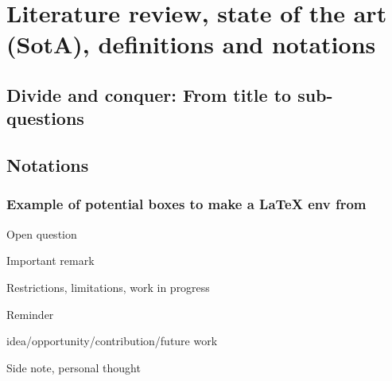 \chapter{Literature review, state of the art (SotA), definitions and notations}
\section{Divide and conquer: From title to sub-questions}

\section{Notations}
\subsection{Example of potential boxes to make a \LaTeX{} env from}
\begin{bclogo}[arrondi=0.1, logo=\bcquestion, couleur=grey,noborder=true]{Open question}
    \lipsum[1-1]
\end{bclogo}


\begin{bclogo}[arrondi=0.1, logo=\bcattention, couleur=grey,noborder=true]{Important remark}
    \lipsum[1-1]
\end{bclogo}

\begin{bclogo}[arrondi=0.1, logo=\bcpanchant, couleur=grey,noborder=true]{Restrictions, limitations, work in progress}
    \lipsum[1-1]
\end{bclogo}

\begin{bclogo}[arrondi=0.1, logo=\bcinfo, couleur=grey,noborder=true]{Reminder}
    \lipsum[1-1]
\end{bclogo}


\begin{bclogo}[arrondi=0.1, logo=\bclampe, couleur=grey,noborder=true]{idea/opportunity/contribution/future work}
    \lipsum[1-1]
\end{bclogo}

\begin{bclogo}[arrondi=0.1, logo=\bccrayon, couleur=grey,noborder=true]{Side note, personal thought}
    \lipsum[1-1]
\end{bclogo}

